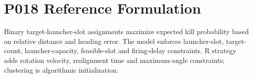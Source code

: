 \section*{P018 Reference Formulation}
Binary target-launcher-slot assignments maximize expected kill probability based on relative distance and heading error. The model enforces launcher-slot, target-count, launcher-capacity, feasible-slot and firing-delay constraints. R strategy adds rotation velocity, realignment time and maximum-angle constraints; clustering is algorithmic initialization.
